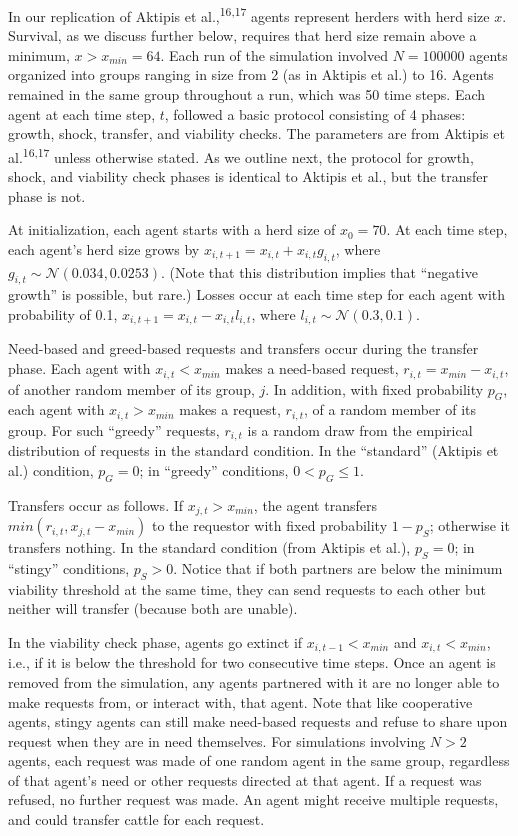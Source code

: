 \documentclass[
]{article}
\begin{document}
In our replication of Aktipis et al.,\textsuperscript{16,17} agents represent herders with herd size \(x\). Survival, as we discuss further below, requires that herd size remain above a minimum, \(x > x_{min} = 64\). Each run of the simulation involved \(N=100000\) agents organized into groups ranging in size from 2 (as in Aktipis et al.) to 16. Agents remained in the same group throughout a run, which was 50 time steps. Each agent at each time step, \(t\), followed a basic protocol consisting of 4 phases: growth, shock, transfer, and viability checks. The parameters are from Aktipis et al.\textsuperscript{16,17} unless otherwise stated. As we outline next, the protocol for growth, shock, and viability check phases is identical to Aktipis et al., but the transfer phase is not.

At initialization, each agent starts with a herd size of \(x_{0}=70\). At each time step, each agent's herd size grows by \(x_{i,t+1} = x_{i,t} + x_{i,t}g_{i,t}\), where \(g_{i,t} \sim \mathcal{N}(0.034, 0.0253)\). (Note that this distribution implies that ``negative growth'' is possible, but rare.) Losses occur at each time step for each agent with probability of 0.1, \(x_{i,t+1} =x_{i,t} - x_{i,t}l_{i,t}\), where \(l_{i,t} \sim \mathcal{N}(0.3, 0.1)\).

Need-based and greed-based requests and transfers occur during the transfer phase. Each agent with \(x_{i,t} < x_{min}\) makes a need-based request, \(r_{i,t}=x_{min} - x_{i,t}\), of another random member of its group, \(j\). In addition, with fixed probability \(p_G\), each agent with \(x_{i,t} > x_{min}\) makes a request, \(r_{i,t}\), of a random member of its group. For such ``greedy'' requests, \(r_{i,t}\) is a random draw from the empirical distribution of requests in the standard condition. In the ``standard'' (Aktipis et al.) condition, \(p_G=0\); in ``greedy'' conditions, \(0<p_G \le 1\).

Transfers occur as follows. If \(x_{j,t}>x_{min}\), the agent transfers \(min(r_{i,t}, x_{j,t}-x_{min})\) to the requestor with fixed probability \(1 - p_S\); otherwise it transfers nothing. In the standard condition (from Aktipis et al.), \(p_S=0\); in ``stingy'' conditions, \(p_S>0\). Notice that if both partners are below the minimum viability threshold at the same time, they can send requests to each other but neither will transfer (because both are unable).

In the viability check phase, agents go extinct if \(x_{i,t-1}<x_{min}\) and \(x_{i,t}<x_{min}\), i.e., if it is below the threshold for two consecutive time steps. Once an agent is removed from the simulation, any agents partnered with it are no longer able to make requests from, or interact with, that agent. Note that like cooperative agents, stingy agents can still make need-based requests and refuse to share upon request when they are in need themselves. For simulations involving \(N>2\) agents, each request was made of one random agent in the same group, regardless of that agent's need or other requests directed at that agent. If a request was refused, no further request was made. An agent might receive multiple requests, and could transfer cattle for each request.
\end{document}
